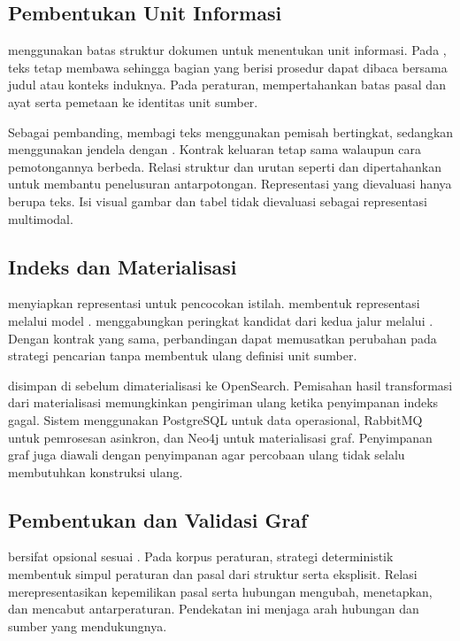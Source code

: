 \subsection{Pembentukan Unit Informasi}
 menggunakan batas struktur dokumen untuk menentukan unit informasi. Pada ,  teks tetap membawa  sehingga bagian yang berisi prosedur dapat dibaca bersama judul atau konteks induknya. Pada peraturan,  mempertahankan batas pasal dan ayat serta pemetaan ke identitas unit sumber.

Sebagai pembanding,  membagi teks menggunakan pemisah bertingkat, sedangkan  menggunakan jendela dengan . Kontrak keluaran tetap sama walaupun cara pemotongannya berbeda. Relasi struktur dan urutan seperti  dan  dipertahankan untuk membantu penelusuran antarpotongan. Representasi yang dievaluasi hanya berupa teks. Isi visual gambar dan tabel tidak dievaluasi sebagai representasi multimodal.

\subsection{Indeks dan Materialisasi}
 menyiapkan representasi untuk pencocokan istilah.  membentuk representasi melalui model .  menggabungkan peringkat kandidat dari kedua jalur melalui . Dengan kontrak yang sama, perbandingan dapat memusatkan perubahan pada strategi pencarian tanpa membentuk ulang definisi unit sumber.

 disimpan di  sebelum dimaterialisasi ke OpenSearch. Pemisahan hasil transformasi dari materialisasi memungkinkan pengiriman ulang ketika penyimpanan indeks gagal. Sistem menggunakan PostgreSQL untuk data operasional, RabbitMQ untuk pemrosesan asinkron, dan Neo4j untuk materialisasi graf. Penyimpanan graf juga diawali dengan penyimpanan  agar percobaan ulang tidak selalu membutuhkan konstruksi ulang.

\subsection{Pembentukan dan Validasi Graf}
 bersifat opsional sesuai . Pada korpus peraturan, strategi deterministik membentuk simpul peraturan dan pasal dari struktur serta  eksplisit. Relasi merepresentasikan kepemilikan pasal serta hubungan mengubah, menetapkan, dan mencabut antarperaturan. Pendekatan ini menjaga arah hubungan dan sumber yang mendukungnya.


